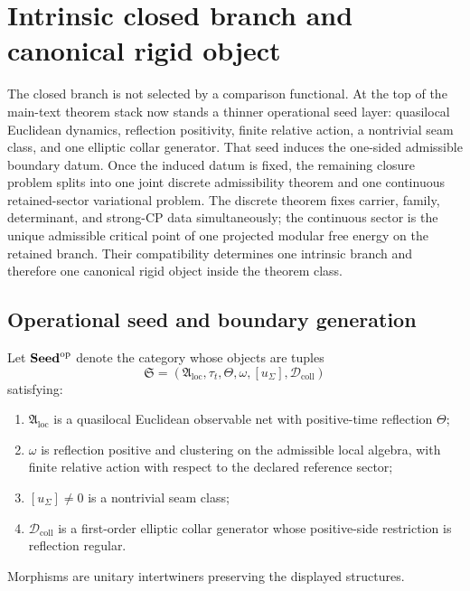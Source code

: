 \section{Intrinsic closed branch and canonical rigid object}
\label{sec:rg-map-compiler-outputs}

The closed branch is not selected by a comparison functional. At the top of the main-text theorem
stack now stands a thinner operational seed layer: quasilocal Euclidean dynamics, reflection
positivity, finite relative action, a nontrivial seam class, and one elliptic collar generator.
That seed induces the one-sided admissible boundary datum. Once the induced datum is fixed, the
remaining closure problem splits into one joint discrete admissibility theorem and one continuous
retained-sector variational problem. The discrete theorem fixes carrier, family, determinant, and
strong-CP data simultaneously; the continuous sector is the unique admissible critical point of one
projected modular free energy on the retained branch. Their compatibility determines one intrinsic
branch and therefore one canonical rigid object inside the theorem class.

\subsection{Operational seed and boundary generation}
\label{sec:operational-seed-generation}

\begin{definition}
\label{def:operational-seed-category}
Let $\mathbf{Seed}^{\mathrm{op}}$ denote the category whose objects are tuples
\[
\mathfrak S=(\mathfrak A_{\mathrm{loc}},\tau_t,\Theta,\omega,[u_\Sigma],\mathcal D_{\mathrm{coll}})
\]
satisfying:
\begin{enumerate}[label=(\roman*), leftmargin=1.5em, topsep=3pt, itemsep=2pt]
    \item $\mathfrak A_{\mathrm{loc}}$ is a quasilocal Euclidean observable net with positive-time
    reflection $\Theta$;
    \item $\omega$ is reflection positive and clustering on the admissible local algebra, with finite
    relative action with respect to the declared reference sector;
    \item $[u_\Sigma]\neq 0$ is a nontrivial seam class;
    \item $\mathcal D_{\mathrm{coll}}$ is a first-order elliptic collar generator whose positive-side
    restriction is reflection regular.
\end{enumerate}
Morphisms are unitary intertwiners preserving the displayed structures.
\end{definition}

